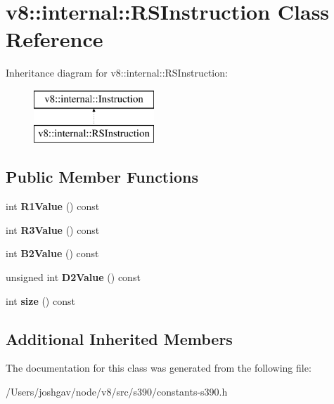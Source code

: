\hypertarget{classv8_1_1internal_1_1_r_s_instruction}{}\section{v8\+:\+:internal\+:\+:R\+S\+Instruction Class Reference}
\label{classv8_1_1internal_1_1_r_s_instruction}
Inheritance diagram for v8\+:\+:internal\+:\+:R\+S\+Instruction\+:\begin{figure}[H]
\begin{center}
\leavevmode
\includegraphics[height=2.000000cm]{classv8_1_1internal_1_1_r_s_instruction}
\end{center}
\end{figure}
\subsection*{Public Member Functions}
\begin{DoxyCompactItemize}
\item 
int {\bfseries R1\+Value} () const \hypertarget{classv8_1_1internal_1_1_r_s_instruction_aa04bc12cd443afe430a460796b6f0db1}{}\label{classv8_1_1internal_1_1_r_s_instruction_aa04bc12cd443afe430a460796b6f0db1}

\item 
int {\bfseries R3\+Value} () const \hypertarget{classv8_1_1internal_1_1_r_s_instruction_af55376e1b83d76d59f318dc7c7c1f77e}{}\label{classv8_1_1internal_1_1_r_s_instruction_af55376e1b83d76d59f318dc7c7c1f77e}

\item 
int {\bfseries B2\+Value} () const \hypertarget{classv8_1_1internal_1_1_r_s_instruction_af3dfe4672eb58c79b0c72f7f8f9e7414}{}\label{classv8_1_1internal_1_1_r_s_instruction_af3dfe4672eb58c79b0c72f7f8f9e7414}

\item 
unsigned int {\bfseries D2\+Value} () const \hypertarget{classv8_1_1internal_1_1_r_s_instruction_acb7fcb17a6761ed6cc11dc7c32b6cefd}{}\label{classv8_1_1internal_1_1_r_s_instruction_acb7fcb17a6761ed6cc11dc7c32b6cefd}

\item 
int {\bfseries size} () const \hypertarget{classv8_1_1internal_1_1_r_s_instruction_aec5b074edbe897637b8958b354291501}{}\label{classv8_1_1internal_1_1_r_s_instruction_aec5b074edbe897637b8958b354291501}

\end{DoxyCompactItemize}
\subsection*{Additional Inherited Members}


The documentation for this class was generated from the following file\+:\begin{DoxyCompactItemize}
\item 
/\+Users/joshgav/node/v8/src/s390/constants-\/s390.\+h\end{DoxyCompactItemize}
